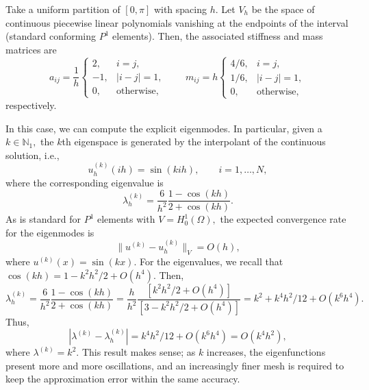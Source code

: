 \documentclass[12pt,a4paper]{article}
\theoremstyle{boldthm}
\theoremstyle{bolddefn}
\begin{document}
Take a uniform partition of $[0, \pi]$ with spacing $h.$ Let $V_h$ be the space of continuous piecewise linear polynomials vanishing at the endpoints of the interval (standard conforming $P^1$ elements). Then, the associated stiffness and mass matrices are
\begin{equation}
a_{ij}
=
\frac{1}{h}
\begin{cases}
2, & i=j,\\
-1, & |i-j|=1,\\
0, & \text{otherwise},
\end{cases}
\qquad
m_{ij}
=
h
\begin{cases}
4/6, & i=j,\\
1/6, & |i-j|=1,\\
0, & \text{otherwise},
\end{cases}
\end{equation}
respectively.

In this case, we can compute the explicit eigenmodes. In particular, given a $k \in \mathbb{N}_1,$ the $k$th eigenspace is generated by the interpolant of the continuous solution, i.e.,
\begin{equation}
u_h^{(k)}(ih) = \sin(kih), \qquad i = 1, \dots, N,
\end{equation}
where the corresponding eigenvalue is
\begin{equation}
\lambda_h^{(k)} = \frac{6}{h^2} \frac{1 - \cos(kh)}{2 + \cos(kh)}.
\end{equation}
As is standard for $P^1$ elements with $V = H_0^1(\Omega),$ the expected convergence rate for the eigenmodes is
\begin{equation}
\| u^{(k)}  - u_h^{(k)} \|_V = O(h),
\end{equation}
where $u^{(k)}(x) = \sin(kx).$
For the eigenvalues, we recall that $\cos(kh) = 1 - k^2h^2/2 + O(h^4).$ Then,
\begin{equation}
\lambda_h^{(k)} = \frac{6}{h^2} \frac{1 - \cos(kh)}{2 + \cos(kh)} = \frac{h}{h^2} \frac{ [k^2h^2/2 + O(h^4)] }{[3 - k^2h^2/2 + O(h^4)] } = k^2 + k^4h^2/12 + O(k^6 h^4).
\end{equation}
Thus,
\begin{equation}
| \lambda^{(k)} - \lambda_h^{(k)} | = k^4h^2/12 + O(k^6 h^4) = O(k^4 h^2),
\end{equation}
where $\lambda^{(k)} = k^2.$
This result makes sense; as $k$ increases, the eigenfunctions present more and more oscillations, and an increasingly finer mesh is required to keep the approximation error within the same accuracy.
\end{document}
